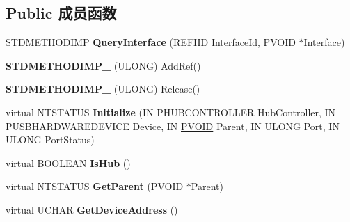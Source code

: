 \subsection*{Public 成员函数}
\begin{DoxyCompactItemize}
\item 
\mbox{\label{class_c_u_s_b_device_a54c7b3c34cba1925b3cbadb3de0918bd}} 
S\+T\+D\+M\+E\+T\+H\+O\+D\+I\+MP {\bfseries Query\+Interface} (R\+E\+F\+I\+ID Interface\+Id, \hyperlink{interfacevoid}{P\+V\+O\+ID} $\ast$Interface)
\item 
\mbox{\label{class_c_u_s_b_device_a154f344583ad6a0c328a8720f54f92a8}} 
{\bfseries S\+T\+D\+M\+E\+T\+H\+O\+D\+I\+M\+P\+\_\+} (U\+L\+O\+NG) Add\+Ref()
\item 
\mbox{\label{class_c_u_s_b_device_ac64bf325d174b03fa4f1e69914c5f5f0}} 
{\bfseries S\+T\+D\+M\+E\+T\+H\+O\+D\+I\+M\+P\+\_\+} (U\+L\+O\+NG) Release()
\item 
\mbox{\label{class_c_u_s_b_device_ac826c0ae14dfc407832f6077d0d15d0d}} 
virtual N\+T\+S\+T\+A\+T\+US {\bfseries Initialize} (IN P\+H\+U\+B\+C\+O\+N\+T\+R\+O\+L\+L\+ER Hub\+Controller, IN P\+U\+S\+B\+H\+A\+R\+D\+W\+A\+R\+E\+D\+E\+V\+I\+CE Device, IN \hyperlink{interfacevoid}{P\+V\+O\+ID} Parent, IN U\+L\+O\+NG Port, IN U\+L\+O\+NG Port\+Status)
\item 
\mbox{\label{class_c_u_s_b_device_ab4543f282e2eda79ab9a9a48ca694aae}} 
virtual \hyperlink{_processor_bind_8h_a112e3146cb38b6ee95e64d85842e380a}{B\+O\+O\+L\+E\+AN} {\bfseries Is\+Hub} ()
\item 
\mbox{\label{class_c_u_s_b_device_a7846a27aa6d66f87f42a59eba8689b57}} 
virtual N\+T\+S\+T\+A\+T\+US {\bfseries Get\+Parent} (\hyperlink{interfacevoid}{P\+V\+O\+ID} $\ast$Parent)
\item 
\mbox{\label{class_c_u_s_b_device_a773b7656548c0c1b495130b74fc557f3}} 
virtual U\+C\+H\+AR {\bfseries Get\+Device\+Address} ()
\item 
\mbox{\label{class_c_u_s_b_device_ad58b657a9557ddb40ff9dfdbfcb245c7}} 

\end{DoxyCompactItemize}
